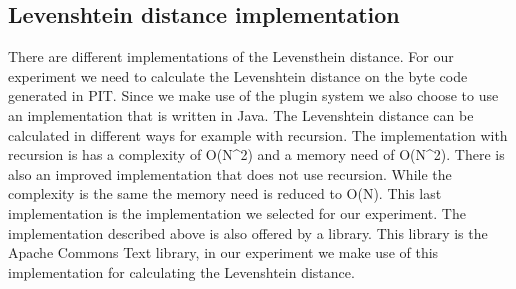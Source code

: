 \documentclass[../../main]{subfiles}
\begin{document}
\subsection{Levenshtein distance implementation}
There are different implementations of the Levensthein distance.
For our experiment we need to calculate the Levenshtein distance on the byte code generated in PIT.
Since we make use of the plugin system we also choose to use an implementation that is written in Java.
The Levenshtein distance can be calculated in different ways for example with recursion.
The implementation with recursion is has a complexity of O(N\^{}2) and a memory need of O(N\^{}2).
There is also an improved implementation that does not use recursion.
While the complexity is the same the memory need is reduced to O(N).
This last implementation is the implementation we selected for our experiment.
The implementation described above is also offered by a library.
This library is the Apache Commons Text library\cite{commonsText}, in our experiment we make use of this implementation for calculating the Levenshtein distance.
\end{document}
